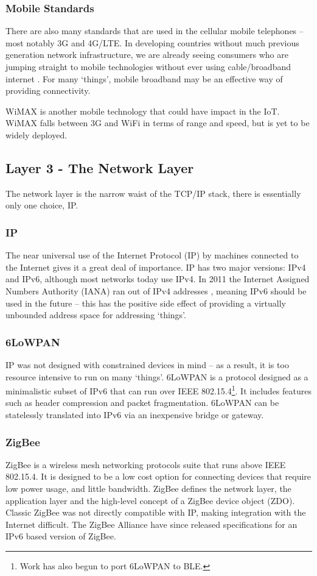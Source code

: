 \documentclass[10pt,journal,compsoc]{IEEEtran}
\begin{document}
\subsubsection{Mobile Standards}
There are also many standards that are used in the cellular mobile telephones
-- most notably 3G and 4G/LTE. In developing countries without much previous
generation network infrastructure, we are already seeing consumers who are
jumping straight to mobile technologies without ever using cable/broadband
internet \cite{Kritzinger2013}. For many `things', mobile broadband may be an
effective way of providing connectivity.  

WiMAX is another mobile technology that could have impact in the IoT. WiMAX
falls between 3G and WiFi in terms of range and speed, but is yet to be widely
deployed.  

\subsection{Layer 3 - The Network Layer}
The network layer is the narrow waist of the TCP/IP stack, there is essentially
only one choice, IP. 

\subsubsection{IP}
The near universal use of the Internet Protocol (IP) by machines connected to
the Internet gives it a great deal of importance. IP has two major versions:
IPv4 and IPv6, although most networks today use IPv4. In 2011 the Internet
Assigned Numbers Authority (IANA) ran out of IPv4 addresses \cite{Potaroo},
meaning IPv6 should be used in the future -- this has the positive side effect
of providing a virtually unbounded address space for addressing `things'. 

\subsubsection{6LoWPAN}
IP was not designed with constrained devices in mind -- as a result, it is too
resource intensive to run on many `things'. 6LoWPAN is a protocol designed as a
minimalistic subset of IPv6 that can run over IEEE 802.15.4\footnote{Work has
also begun to port 6LoWPAN to BLE.}. It includes features such as header
compression and packet fragmentation. 6LoWPAN can be statelessly translated
into IPv6 via an inexpensive bridge or gateway. 

\subsubsection{ZigBee}
ZigBee is a wireless mesh networking protocols suite that runs above IEEE
802.15.4. It is designed to be a low cost option for connecting devices that
require low power usage, and little bandwidth. ZigBee defines the network
layer, the application layer and the high-level concept of a ZigBee device
object (ZDO). Classic ZigBee was not directly compatible with IP, making
integration with the Internet difficult. The ZigBee Alliance have since
released specifications for an IPv6 based version of ZigBee.
\end{document}
